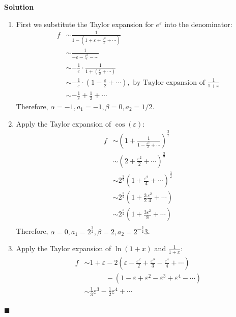 \documentclass[11pt]{article}
\newcommand{\vep}{\varepsilon}
\theoremstyle{problemstyle}
\newenvironment{solution}
  {\noindent\textbf{Solution}\quad}
  {\hfill$\blacksquare$\par\vspace{1em}}
\begin{document}
\begin{solution}
  \begin{enumerate}
    \item First we substitute the Taylor expansion for $e^\vep$ into the denominator:
      \begin{align*}
        f & \sim \frac{1}{1 - \left(1 + \vep + \frac{\vep^2}{2} + \cdots \right)} \\
          & \sim \frac{1}{-\vep - \frac{\vep^2}{2} - \cdots} \\
          & \sim -\frac{1}{\vep} \cdot \frac{1}{1 + \left( \frac{\vep}{2} + \cdots \right)} \\
          & \sim -\frac{1}{\vep} \cdot \left(1 - \frac{\vep}{2} + \cdots \right), \text{ by Taylor
            expansion of } \frac{1}{1+x} \\
          & \sim -\frac{1}{\vep} + \frac{1}{2} + \cdots
      \end{align*}
      Therefore, $\alpha = -1, a_1 = -1, \beta = 0, a_2 = 1/2$.
    \item Apply the Taylor expansion of $\cos(\vep)$:
      \begin{align*}
        f & \sim \left(1 + \frac{1}{1 - \frac{\vep^2}{2} + \cdots}\right)^{\frac{3}{2}} \\
          & \sim \left(2 + \frac{\vep^2}{2} + \cdots\right)^{\frac{3}{2}} \\
          & \sim 2^{\frac{3}{2}} \left(1 + \frac{\vep^2}{4} + \cdots\right)^{\frac{3}{2}} \\
          & \sim 2^{\frac{3}{2}} \left(1 + \frac{3}{2}\frac{\vep^2}{4} + \cdots\right) \\
          & \sim 2^{\frac{3}{2}} \left(1 + \frac{3\vep^2}{8} + \cdots\right) \\
      \end{align*}
      Therefore, $\alpha = 0, a_1 = 2^{\frac{3}{2}}, \beta = 2, a_2 = 2^{-\frac{3}{2}}3$.
    \item Apply the Taylor expansion of $\ln(1+x)$ and $\frac{1}{1+x}$:
      \begin{align*}
        f &\sim 1 + \vep - 2\left(\vep - \frac{\vep^2}{2} + \frac{\vep^3}{3} - \frac{\vep^4}{4} +
            \cdots \right) \\
          & \quad \quad \quad - \left(1 - \vep + \vep^2 - \vep^3 + \vep^4 - \cdots \right) \\
          & \sim \frac{1}{3}\vep^3 - \frac{1}{2}\vep^4 + \cdots \\ 
      \end{align*}

\end{enumerate}
\end{solution}
\end{document}
